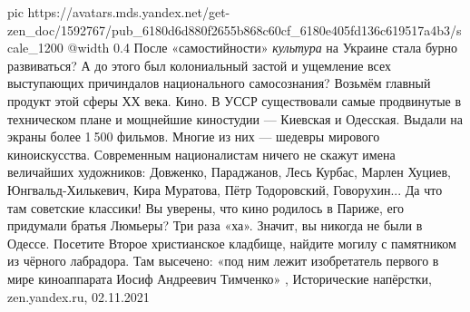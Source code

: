 \ifcmt
  pic https://avatars.mds.yandex.net/get-zen_doc/1592767/pub_6180d6d880f2655b868c60cf_6180e405fd136c619517a4b3/scale_1200
  @width 0.4
\fi
После «самостийности» \emph{культура} на Украине стала бурно развиваться? А до
этого был колониальный застой и ущемление всех выступающих причиндалов
национального самосознания? Возьмём главный продукт этой сферы ХХ века. Кино. В
УССР существовали самые продвинутые в техническом плане и мощнейшие киностудии
— Киевская и Одесская. Выдали на экраны более 1 500 фильмов.  Многие из них —
шедевры мирового киноискусства. Современным националистам ничего не скажут
имена величайших художников: Довженко, Параджанов, Лесь Курбас, Марлен Хуциев,
Юнгвальд-Хилькевич, Кира Муратова, Пётр Тодоровский, Говорухин... Да что там
советские классики! Вы уверены, что кино родилось в Париже, его придумали
братья Люмьеры?  Три раза «ха». Значит, вы никогда не были в Одессе. Посетите
Второе христианское кладбище, найдите могилу с памятником из чёрного лабрадора.
Там высечено: «под ним лежит изобретатель первого в мире киноаппарата Иосиф
Андреевич Тимченко»
, 
Исторические напёрстки, zen.yandex.ru, 02.11.2021
